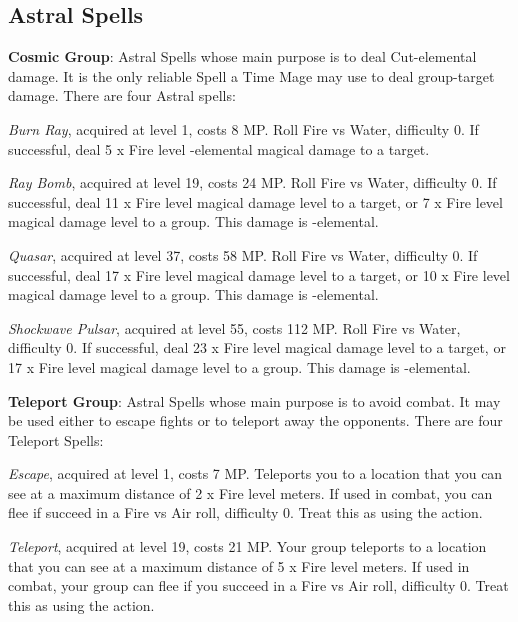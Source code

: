 \begin{multicols}{2}
    
    \subsection{Astral Spells}\label{subsec:time-astral}

    \textbf{Cosmic Group}: Astral Spells whose main purpose is to deal Cut-elemental damage. It is the only reliable Spell a Time Mage may use to deal group-target damage. There are four Astral spells:
    
    \textit{Burn Ray}, acquired at level 1, costs 8 MP\@. Roll Fire vs Water, difficulty 0. If successful, deal 5 x Fire level -elemental magical damage to a target.
    
    \textit{Ray Bomb}, acquired at level 19, costs 24 MP\@. Roll Fire vs Water, difficulty 0. If successful, deal 11 x Fire level magical damage level to a target, or 7 x Fire level magical damage level to a group. This damage is -elemental.
    
    \textit{Quasar}, acquired at level 37, costs 58 MP\@. Roll Fire vs Water, difficulty 0. If successful, deal 17 x Fire level magical damage level to a target, or 10 x Fire level magical damage level to a group. This damage is -elemental.
    
    \textit{Shockwave Pulsar}, acquired at level 55, costs 112 MP\@. Roll Fire vs Water, difficulty 0. If successful, deal 23 x Fire level magical damage level to a target, or 17 x Fire level magical damage level to a group. This damage is -elemental.
    
    \ffcrystal[type=level,height=8pt]

    \textbf{Teleport Group}: Astral Spells whose main purpose is to avoid combat. It may be used either to escape fights or to teleport away the opponents. There are four Teleport Spells:
	
    \textit{Escape}, acquired at level 1, costs 7 MP\@. Teleports you to a location that you can see at a maximum distance of 2 x Fire level meters. If used in combat, you can flee if succeed in a Fire vs Air roll, difficulty 0. Treat this as using the  action.
    
    \textit{Teleport}, acquired at level 19, costs 21 MP\@. Your group teleports to a location that you can see at a maximum distance of 5 x Fire level meters. If used in combat, your group can flee if you succeed in a Fire vs Air roll, difficulty 0. Treat this as using the  action.
    

\end{multicols}
